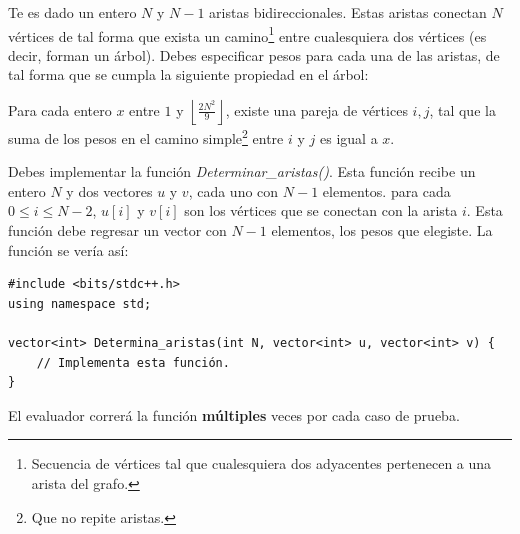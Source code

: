 \documentclass[12pt]{scrartcl}
\begin{document}
    
    
    \vspace{10pt}

    
    
        Te es dado un entero $N$ y $N - 1$ aristas bidireccionales. Estas aristas conectan $N$ vértices de tal forma que exista un camino\footnote{Secuencia de vértices tal que cualesquiera dos adyacentes pertenecen a una arista del grafo.} entre cualesquiera dos vértices (es decir, forman un árbol). Debes especificar pesos para cada una de las aristas, de tal forma que se cumpla la siguiente propiedad en el árbol:
        
        Para cada entero $x$ entre $1$ y $\left\lfloor \frac{2N^2}{9} \right\rfloor$, existe una pareja de vértices $i, j$, tal que la suma de los pesos en el camino simple\footnote{Que no repite aristas.} entre $i$ y $j$ es igual a $x$.
    

        Debes implementar la función \textit{Determinar\_aristas()}. Esta función recibe un entero $N$ y dos vectores $u$ y $v$, cada uno con $N - 1$ elementos. para cada $0 \le i \le N - 2$, $u[i]$ y $v[i]$ son los vértices que se conectan con la arista $i$. Esta función debe regresar un vector con $N - 1$ elementos, los pesos que elegiste.
        La función se vería así:

\begin{verbatim}
#include <bits/stdc++.h>
using namespace std;

vector<int> Determina_aristas(int N, vector<int> u, vector<int> v) {
    // Implementa esta función.
}
\end{verbatim}

    El evaluador correrá la función \textbf{múltiples} veces por cada caso de prueba.

    
\end{document}
